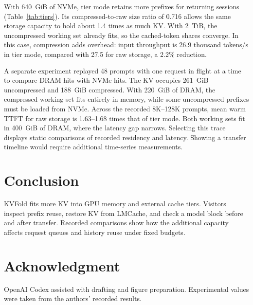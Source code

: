 \documentclass[conference]{IEEEtran}
\begin{document}
With 640~GiB of NVMe, tier mode retains more prefixes for returning
sessions (Table~\ref{tab:tiers}). Its compressed-to-raw size ratio of
0.716 allows the same storage capacity to hold about 1.4 times as much
KV. With 2~TiB, the uncompressed working set already fits, so the
cached-token shares converge. In this case, compression adds overhead:
input throughput is 26.9 thousand tokens/s in tier mode, compared with
27.5 for raw storage, a 2.2\% reduction.

A separate experiment replayed 48 prompts with one request in flight at a
time to compare DRAM hits with NVMe hits. The KV occupies 261~GiB
uncompressed and 188~GiB compressed. With 220~GiB of DRAM, the compressed
working set fits entirely in memory, while some uncompressed prefixes
must be loaded from NVMe. Across the recorded 8K--128K prompts, mean warm
TTFT for raw storage is 1.63--1.68 times that of tier mode. Both working
sets fit in 400~GiB of DRAM, where the latency gap narrows. Selecting this
trace displays static comparisons of recorded residency and latency.
Showing a transfer timeline would require additional time-series
measurements.

\section{Conclusion}
KVFold fits more KV into GPU memory and external cache tiers. Visitors
inspect prefix reuse, restore KV from LMCache, and check a model block
before and after transfer. Recorded comparisons show how the additional
capacity affects request queues and history reuse under fixed budgets.

\section*{Acknowledgment}
OpenAI Codex assisted with drafting and figure preparation. Experimental
values were taken from the authors' recorded results.



\end{document}
